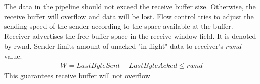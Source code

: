 \documentclass[a4paper]{article}
\theoremstyle{plain}
\theoremstyle{definition}
\newtheorem{defn}{Definition}[section]
\theoremstyle{remark}
\begin{document}
\begin{tcolorbox}[colback=black!3!white,colframe=black!60!white,title=\begin{defn}Flow Control \label{Flow Control}\end{defn}]
The data in the pipeline should not exceed the receive buffer size. Otherwise, the receive buffer will overflow and data will be lost. Flow control tries to adjust the sending speed of the sender according to the space available at the buffer. Receiver advertises the free buffer space in the receive window field. It is denoted by rwnd. Sender limits amount of unacked "in-flight" data to receiver's $rwnd$ value.
\begin{align*}
	W = LastByteSent - LastByteAcked \le rwnd
\end{align*}
This guarantees receive buffer will not overflow
\end{tcolorbox}
\end{document}
